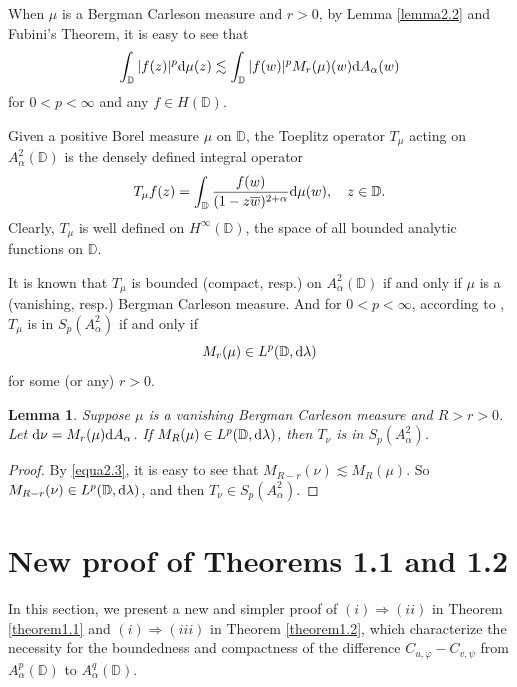 \documentclass[preprint,12pt,times]{elsarticle}
\newtheorem{lemma}[theorem]{Lemma}
\theoremstyle{definition}
\theoremstyle{remark}
\numberwithin{equation}{section}
\begin{document}
When $\mu$ is a Bergman Carleson measure and $r>0$, by Lemma \ref{lemma2.2} and Fubini's Theorem, it is easy to see that
\begin{equation}\label{equa2.7}
\int_{\mathbb{D}}|f(z)|^p{\rm d}\mu(z)\lesssim \int_{\mathbb{D}}|f(w)|^pM_r(\mu)(w){\rm d}A_{\alpha}(w)
\end{equation} 
for $0<p<\infty$ and any $f\in H(\mathbb{D})$. 

Given a positive Borel measure $\mu$ on $\mathbb{D}$, the Toeplitz operator $T_{\mu}$ acting on $A_{\alpha}^2(\mathbb{D})$ is the densely defined integral operator
\[T_{\mu}f(z)=\int_{\mathbb{D}}\frac{f(w)}{(1-z\overline{w})^{2+\alpha}}{\rm d}\mu(w),\quad z\in\mathbb{D}.\]
Clearly, $T_{\mu}$ is well defined on $H^{\infty}(\mathbb{D})$, the space of all bounded analytic functions on $\mathbb{D}$.

It is known that $T_{\mu}$ is bounded (compact, resp.) on $A_{\alpha}^2(\mathbb{D})$ if and only if $\mu$ is a (vanishing, resp.) Bergman Carleson measure. And for $0<p<\infty$, according to \cite[Theorem 7.18]{29}, $T_{\mu}$ is in $S_p(A_{\alpha}^2)$ if and only if 
\begin{equation}\label{equa2.8}
M_r(\mu)\in L^p(\mathbb{D},{\rm d}\lambda)
\end{equation}
for some (or any) $r>0$.

\begin{lemma}\label{lemma2.8}
Suppose $\mu$ is a vanishing Bergman Carleson measure and $R>r>0$. Let ${\rm d}\nu=M_r(\mu){\rm d}A_{\alpha}$. If $M_R(\mu)\in L^p(\mathbb{D},{\rm d}\lambda)$, then $T_\nu$ is in $S_p(A_{\alpha}^2)$.
\end{lemma}

\begin{proof}
By \eqref{equa2.3}, it is easy to see that $M_{R-r}(\nu)\lesssim M_R(\mu)$. So $M_{R-r}(\nu)\in L^{p}(\mathbb{D},{\rm d}\lambda)$, and then $T_{\nu}\in S_p(A_{\alpha}^2)$.
\end{proof}



\section{New proof of Theorems 1.1 and 1.2}

In this section, we present a new and simpler proof of $(i)\Rightarrow(ii)$ in Theorem \ref{theorem1.1} and $(i)\Rightarrow(iii)$ in Theorem \ref{theorem1.2}, which characterize the necessity for the boundedness and compactness of the difference $C_{u,\varphi}-C_{v,\psi}$ from $A_{\alpha}^p(\mathbb{D})$ to $A_{\alpha}^q(\mathbb{D})$.
\end{document}
